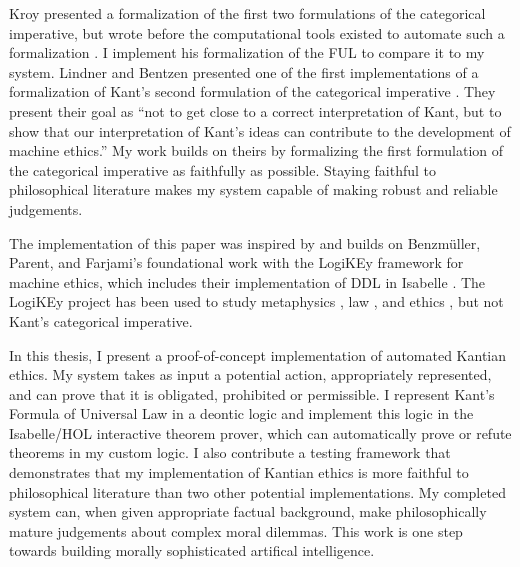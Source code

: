 \begin{isabellebody}
\begin{isamarkuptext}
Kroy presented a formalization of the first two formulations of the categorical imperative, but wrote 
before the computational tools existed to automate such a formalization \citep{kroy}. I implement his formalization of the FUL to compare it to my system. 
Lindner and Bentzen presented one of the first implementations of a formalization of 
Kant's second formulation of the categorical imperative \citep{BL}. They present their goal as ``not to get 
close to a correct interpretation of Kant, but to show that our interpretation of Kant’s ideas can 
contribute to the development of machine ethics.'' My work builds on theirs by formalizing the 
first formulation of the categorical imperative as faithfully as possible. Staying faithful to 
philosophical literature makes my system capable of making robust and reliable judgements. 

The implementation of this paper was inspired by and builds on Benzmüller, Parent, and Farjami's 
foundational work with the LogiKEy framework for machine ethics, which includes their implementation 
of DDL in Isabelle \citep{logikey, BFP}. The LogiKEy project has been used to study metaphysics 
\citep{godel, metaphysics1}, law \citep{constitution}, and ethics \citep{gewirth}, but not 
Kant's categorical imperative.%
\end{isamarkuptext}\isamarkuptrue%
%
\isadelimdocument
%
\endisadelimdocument
%
\isatagdocument
%
\isamarkuptrue%
%
\endisatagdocument
{\isafolddocument}%
%
\isadelimdocument
%
\endisadelimdocument
%
\begin{isamarkuptext}%
In this thesis, I present a proof-of-concept implementation of automated Kantian ethics. My system
takes as input a potential action, appropriately represented, and can prove that it is obligated, 
prohibited or permissible. I represent Kant's Formula of Universal Law in a deontic logic and 
implement this logic in the Isabelle/HOL interactive theorem prover, which can automatically prove or 
refute theorems in my custom logic. I also contribute a testing framework that demonstrates that
my implementation of Kantian ethics is more faithful to philosophical literature than two other 
potential implementations. My completed system can, when given appropriate factual background, make
philosophically mature judgements about complex moral dilemmas. This work is one step towards building 
morally sophisticated artifical intelligence.


\end{isamarkuptext}
\end{isabellebody}
